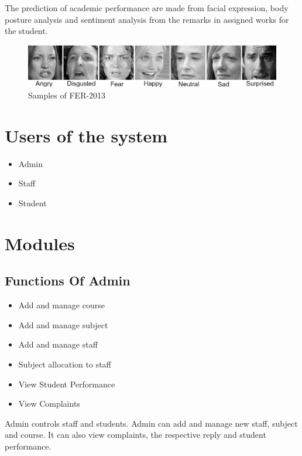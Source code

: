 \par The prediction of academic performance are made from facial expression, body posture analysis and sentiment analysis from the remarks in assigned works for the student.
\begin{figure}[!ht]
\centering
\includegraphics[width=125mm]{dataset-cover.png}
\caption{Samples of FER-2013}
\end{figure} 

\section{Users of the system}
\begin{itemize}
    \item Admin
    \item Staff
    \item Student
\end{itemize}

\section{Modules}
\subsection{Functions Of Admin}
\begin{itemize}
    \item Add and manage course
    \item Add and manage subject 
    \item Add and manage staff
    \item Subject allocation to staff
    \item View Student Performance
    \item View Complaints 
    
\end{itemize}
\par Admin controls staff and students. Admin can add and manage new staff, subject and course. It can also view complaints, the respective reply and student performance.

